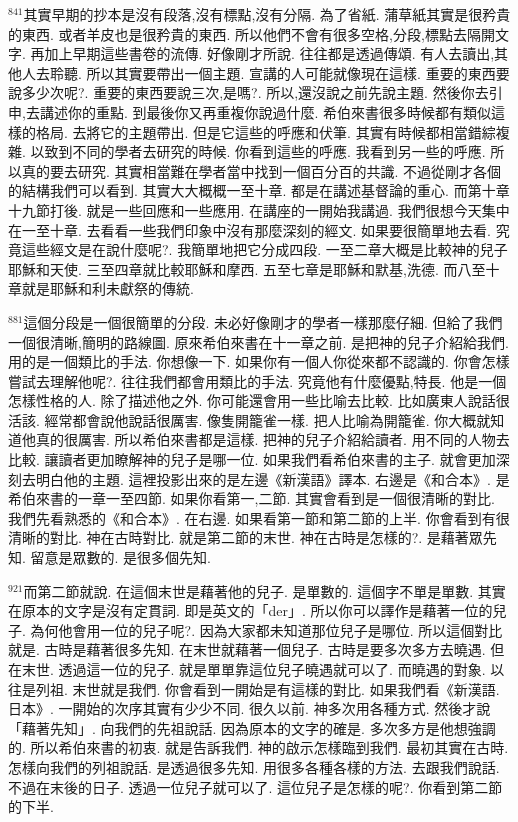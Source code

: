 \documentclass{book}
\begin{document}
$^{841}$其實早期的抄本是沒有段落,沒有標點,沒有分隔.
為了省紙.
蒲草紙其實是很矜貴的東西.
或者羊皮也是很矜貴的東西.
所以他們不會有很多空格,分段,標點去隔開文字.
再加上早期這些書卷的流傳.
好像剛才所說.
往往都是透過傳頌.
有人去讀出,其他人去聆聽.
所以其實要帶出一個主題.
宣講的人可能就像現在這樣.
重要的東西要說多少次呢?.
重要的東西要說三次,是嗎?.
所以,還沒說之前先說主題.
然後你去引申,去講述你的重點.
到最後你又再重複你說過什麼.
希伯來書很多時候都有類似這樣的格局.
去將它的主題帶出.
但是它這些的呼應和伏筆.
其實有時候都相當錯綜複雜.
以致到不同的學者去研究的時候.
你看到這些的呼應.
我看到另一些的呼應.
所以真的要去研究.
其實相當難在學者當中找到一個百分百的共識.
不過從剛才各個的結構我們可以看到.
其實大大概概一至十章.
都是在講述基督論的重心.
而第十章十九節打後.
就是一些回應和一些應用.
在講座的一開始我講過.
我們很想今天集中在一至十章.
去看看一些我們印象中沒有那麼深刻的經文.
如果要很簡單地去看.
究竟這些經文是在說什麼呢?.
我簡單地把它分成四段.
一至二章大概是比較神的兒子耶穌和天使.
三至四章就比較耶穌和摩西.
五至七章是耶穌和默基,洗德.
而八至十章就是耶穌和利未獻祭的傳統.

$^{881}$這個分段是一個很簡單的分段.
未必好像剛才的學者一樣那麼仔細.
但給了我們一個很清晰,簡明的路線圖.
原來希伯來書在十一章之前.
是把神的兒子介紹給我們.
用的是一個類比的手法.
你想像一下.
如果你有一個人你從來都不認識的.
你會怎樣嘗試去理解他呢?.
往往我們都會用類比的手法.
究竟他有什麼優點,特長.
他是一個怎樣性格的人.
除了描述他之外.
你可能還會用一些比喻去比較.
比如廣東人說話很活該.
經常都會說他說話很厲害.
像隻開籠雀一樣.
把人比喻為開籠雀.
你大概就知道他真的很厲害.
所以希伯來書都是這樣.
把神的兒子介紹給讀者.
用不同的人物去比較.
讓讀者更加瞭解神的兒子是哪一位.
如果我們看希伯來書的主子.
就會更加深刻去明白他的主題.
這裡投影出來的是左邊《新漢語》譯本.
右邊是《和合本》.
是希伯來書的一章一至四節.
如果你看第一,二節.
其實會看到是一個很清晰的對比.
我們先看熟悉的《和合本》.
在右邊.
如果看第一節和第二節的上半.
你會看到有很清晰的對比.
神在古時對比.
就是第二節的末世.
神在古時是怎樣的?.
是藉著眾先知.
留意是眾數的.
是很多個先知.

$^{921}$而第二節就說.
在這個末世是藉著他的兒子.
是單數的.
這個字不單是單數.
其實在原本的文字是沒有定貫詞.
即是英文的「der」.
所以你可以譯作是藉著一位的兒子.
為何他會用一位的兒子呢?.
因為大家都未知道那位兒子是哪位.
所以這個對比就是.
古時是藉著很多先知.
在末世就藉著一個兒子.
古時是要多次多方去曉遇.
但在末世.
透過這一位的兒子.
就是單單靠這位兒子曉遇就可以了.
而曉遇的對象.
以往是列祖.
末世就是我們.
你會看到一開始是有這樣的對比.
如果我們看《新漢語.日本》.
一開始的次序其實有少少不同.
很久以前.
神多次用各種方式.
然後才說「藉著先知」.
向我們的先祖說話.
因為原本的文字的確是.
多次多方是他想強調的.
所以希伯來書的初衷.
就是告訴我們.
神的啟示怎樣臨到我們.
最初其實在古時.
怎樣向我們的列祖說話.
是透過很多先知.
用很多各種各樣的方法.
去跟我們說話.
不過在末後的日子.
透過一位兒子就可以了.
這位兒子是怎樣的呢?.
你看到第二節的下半.
\end{document}
